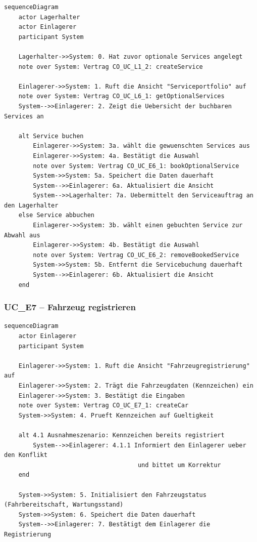 \begin{lstlisting}[basicstyle=\ttfamily\small, breaklines=true]
sequenceDiagram
    actor Lagerhalter
    actor Einlagerer
    participant System

    Lagerhalter->>System: 0. Hat zuvor optionale Services angelegt
    note over System: Vertrag CO_UC_L1_2: createService

    Einlagerer->>System: 1. Ruft die Ansicht "Serviceportfolio" auf
    note over System: Vertrag CO_UC_L6_1: getOptionalServices
    System-->>Einlagerer: 2. Zeigt die Uebersicht der buchbaren Services an

    alt Service buchen
        Einlagerer->>System: 3a. wählt die gewuenschten Services aus
        Einlagerer->>System: 4a. Bestätigt die Auswahl
        note over System: Vertrag CO_UC_E6_1: bookOptionalService
        System->>System: 5a. Speichert die Daten dauerhaft
        System-->>Einlagerer: 6a. Aktualisiert die Ansicht
        System-->>Lagerhalter: 7a. Uebermittelt den Serviceauftrag an den Lagerhalter
    else Service abbuchen
        Einlagerer->>System: 3b. wählt einen gebuchten Service zur Abwahl aus
        Einlagerer->>System: 4b. Bestätigt die Auswahl
        note over System: Vertrag CO_UC_E6_2: removeBookedService
        System->>System: 5b. Entfernt die Servicebuchung dauerhaft
        System-->>Einlagerer: 6b. Aktualisiert die Ansicht
    end
\end{lstlisting}

\newpage

{}
\subsubsection*{UC\_E7 – Fahrzeug registrieren}

\begin{lstlisting}[basicstyle=\ttfamily\small, breaklines=true]
sequenceDiagram
    actor Einlagerer
    participant System

    Einlagerer->>System: 1. Ruft die Ansicht "Fahrzeugregistrierung" auf
    Einlagerer->>System: 2. Trägt die Fahrzeugdaten (Kennzeichen) ein
    Einlagerer->>System: 3. Bestätigt die Eingaben
    note over System: Vertrag CO_UC_E7_1: createCar
    System->>System: 4. Prueft Kennzeichen auf Gueltigkeit

    alt 4.1 Ausnahmeszenario: Kennzeichen bereits registriert
        System-->>Einlagerer: 4.1.1 Informiert den Einlagerer ueber den Konflikt
                                     und bittet um Korrektur
    end

    System->>System: 5. Initialisiert den Fahrzeugstatus (Fahrbereitschaft, Wartungsstand)
    System->>System: 6. Speichert die Daten dauerhaft
    System-->>Einlagerer: 7. Bestätigt dem Einlagerer die Registrierung
\end{lstlisting}

